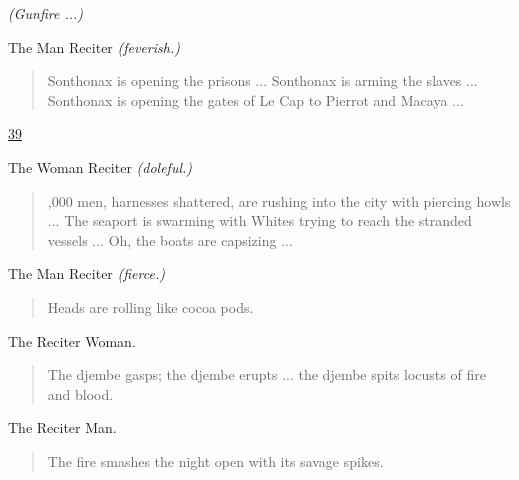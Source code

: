 \documentclass[letterpaper,article,12pt,oneside,notitlepage]{memoir}
\begin{document}
\textit{(Gunfire ...)}

\begin{center}The Man Reciter \textit{(feverish.)}\end{center}

\begin{verse}
\hspace{1cm} Sonthonax is opening the prisons ... Sonthonax is arming the slaves ... \\
Sonthonax is opening the gates of Le Cap to Pierrot and Macaya ... \\
\end{verse}

\clearpage

\href{http://cesaire.elotroalex.com/chiens/chiens/p039.html}{39}

\begin{center}The Woman Reciter \textit{(doleful.)}\end{center}

\begin{verse}
,000 men, harnesses shattered, are rushing into the city with piercing howls ... The seaport is swarming with Whites trying to reach the stranded vessels ... Oh, the boats are capsizing ...  \\
\end{verse}

\begin{center}The Man Reciter \textit{(fierce.)}\end{center}

\begin{verse}
\hspace{1cm} Heads are rolling like cocoa pods. \\
\end{verse}

\begin{center}The Reciter Woman.\end{center}

\begin{verse}
\indent The djembe gasps; the djembe erupts ... the djembe spits locusts of fire and blood. \\
\end{verse}

\begin{center}The Reciter Man.\end{center}

\begin{verse}
\hspace{1cm} The fire smashes the night open with its savage spikes. \\
\end{verse}
\end{document}
